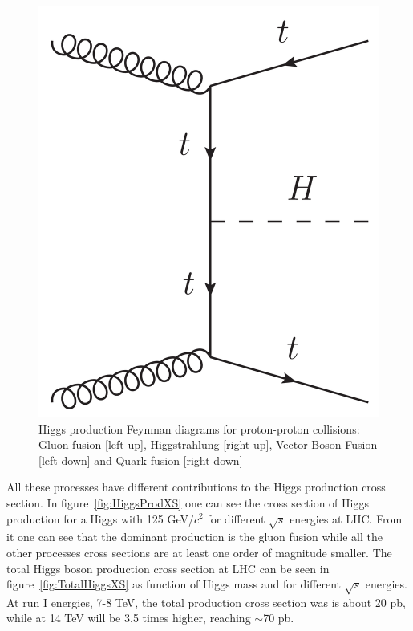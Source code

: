 \begin{figure}[!Hhtbp]
\begin{center}
    \includegraphics[scale=0.45]{figs/QuarkF_H.png}
    \caption{Higgs production Feynman diagrams for proton-proton collisions: Gluon fusion [left-up], Higgstrahlung [right-up], Vector Boson Fusion [left-down] and Quark fusion [right-down]}
    \label{fig:HiggsProd}
  \end{center}
\end{figure}

All these processes have different contributions to the Higgs production cross section. In figure~\ref{fig:HiggsProdXS} one can see the cross section of Higgs production for a Higgs with 125 GeV/$c^{2}$ for different $\sqrt{s}$ energies at LHC. From it one can see that the dominant production is the gluon fusion while all the other processes cross sections are at least one order of magnitude smaller. The total Higgs boson production cross section at LHC can be seen in figure~\ref{fig:TotalHiggsXS} as function of Higgs mass and for different $\sqrt{s}$ energies. At run I energies, 7-8 TeV, the total production cross section was is about 20 pb, while at 14 TeV will be 3.5 times higher, reaching $\sim$70 pb. 

